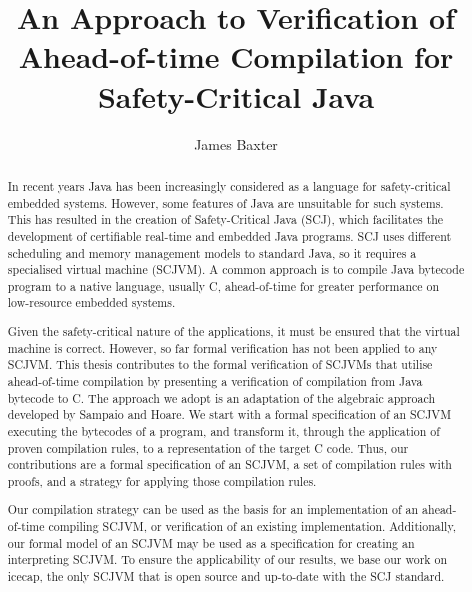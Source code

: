 \documentclass[a4paper,11pt]{report}
\title{An Approach to Verification of Ahead-of-time Compilation for
  Safety-Critical Java}
\author{James Baxter}
\date{}
\begin{document}
\maketitle


\begin{abstract}
  In recent years Java has been increasingly considered as a language
  for safety-critical embedded systems.
  However, some features of Java are unsuitable for such systems.
  This has resulted in the creation of Safety-Critical Java (SCJ),
  which facilitates the development of certifiable real-time and
  embedded Java programs.
  SCJ uses different scheduling and memory management models to
  standard Java, so it requires a specialised virtual machine (SCJVM).
  A common approach is to compile Java bytecode program to a native
  language, usually C, ahead-of-time for greater performance on
  low-resource embedded systems.
  
  Given the safety-critical nature of the applications, it must be
  ensured that the virtual machine is correct.
  However, so far formal verification has not been applied to any
  SCJVM.
  This thesis contributes to the formal verification of SCJVMs that
  utilise ahead-of-time compilation by presenting a verification of
  compilation from Java bytecode to C.
  The approach we adopt is an adaptation of the algebraic approach
  developed by Sampaio and Hoare.
  We start with a formal specification of an SCJVM executing the
  bytecodes of a program, and transform it, through the application
  of proven compilation rules, to a representation of the target C
  code.
  Thus, our contributions are a formal specification of an SCJVM, a
  set of compilation rules with proofs, and a strategy for applying
  those compilation rules.
  
  Our compilation strategy can be used as the basis for an
  implementation of an ahead-of-time compiling SCJVM, or verification
  of an existing implementation.
  Additionally, our formal model of an SCJVM may be used as a
  specification for creating an interpreting SCJVM.
  To ensure the applicability of our results, we base our work on
  icecap, the only SCJVM that is open source and up-to-date with the
  SCJ standard.
\end{abstract}

\tableofcontents






\end{document}

